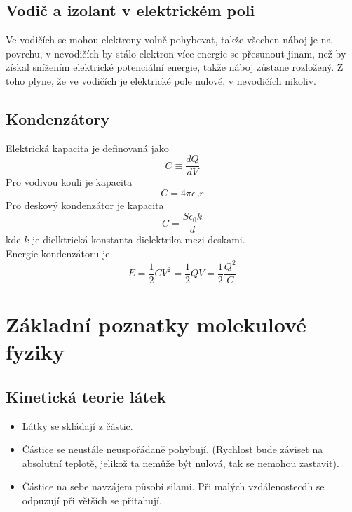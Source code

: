 \documentclass[titlepage]{book}
\begin{document}
\section{Vodič a izolant v elektrickém poli}
Ve vodičích se mohou elektrony volně pohybovat, takže všechen náboj je na povrchu, v nevodičích by stálo elektron více energie se přesunout jinam, než by získal snížením elektrické potenciální energie, takže náboj zůstane rozložený. Z toho plyne, že ve vodičích je elektrické pole nulové, v nevodičích nikoliv.
\section{Kondenzátory}
Elektrická kapacita je definovaná jako\\
\begin{equation}
C \equiv \frac{dQ}{dV}
\end{equation}
Pro vodivou kouli je kapacita\\
\begin{equation}
C = 4\pi \epsilon_0 r
\end{equation}
Pro deskový kondenzátor je kapacita\\
\begin{equation}
C = \frac{S\epsilon_0 k}{d}
\end{equation}
kde $k$ je dielktrická konstanta dielektrika mezi deskami.\\
Energie kondenzátoru je\\
\begin{equation}
E = \frac{1}{2}CV^2 = \frac{1}{2}QV  = \frac{1}{2}\frac{Q^2}{C}
\end{equation}
\chapter{Základní poznatky molekulové fyziky}
\section{Kinetická teorie látek}
\begin{itemize}
\item Látky se skládají z částic.
\item Částice se neustále neuspořádaně pohybují. (Rychlost bude záviset na absolutní teplotě, jelikož ta nemůže být nulová, tak se nemohou zastavit).
\item Částice na sebe navzájem působí silami. Při malých vzdálenostecdh se odpuzují při větších se přitahují.
\end{itemize}
\end{document}
